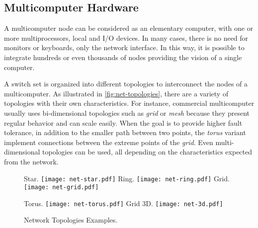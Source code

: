 		\subsection{Multicomputer Hardware}
		\label{sec.multicomputers-hw}

			A multicomputer node can be considered as an elementary computer, with one or
			more multiprocessors, local \ram and I/O devices.
			In many cases, there is no need for monitors or keyboards, only the
			network interface.
			In this way, it is possible to integrate hundreds or even thousands
			of nodes providing the vision of a single computer.

			A switch set is organized into different topologies to interconnect
			the nodes of a multicomputer.
			As illustrated in \autoref{fig:net-topologies}, there are a
			variety of topologies with their own characteristics.
			For instance, commercial multicomputer usually uses bi-dimensional
			topologies such as \textit{grid} or \textit{mesh} because they present
			regular behavior and can scale easily.
			When the goal is to provide higher fault tolerance, in addition to the
			smaller path between two points, the \textit{torus} variant implement
			connections between the extreme points of the \textit{grid}.
			Even multi-dimensional topologies can be used, all depending on the
			characteristics expected from the network.

			\begin{figure}[!tb]
				\centering%
				\caption{Network Topologies Examples.}%
				\label{fig:net-topologies}%

					{Star.}%
					{\texttt{[image: net-star.pdf]}}%
				\hspace{1cm}%
					{Ring.}%
					{\texttt{[image: net-ring.pdf]}}%
				\hspace{1cm}%
					{Grid.}%
					{\texttt{[image: net-grid.pdf]}}%

					{Torus.}%
					{\texttt{[image: net-torus.pdf]}}%
				\hspace{1cm}%
					{Grid 3D.}%
					{\texttt{[image: net-3d.pdf]}}%

			\end{figure}

